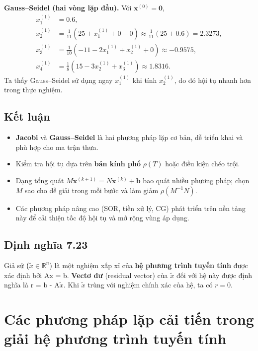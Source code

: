 \textbf{Gauss--Seidel (hai vòng lặp đầu).}
Với $\mathbf{x}^{(0)}=\mathbf{0}$,
\[
\begin{aligned}
x_1^{(1)} &= 0.6,\\
x_2^{(1)} &= \tfrac{1}{11}(25 + x_1^{(1)} + 0 - 0) \approx \tfrac{1}{11}(25 + 0.6)=2.3273,\\
x_3^{(1)} &= \tfrac{1}{10}(-11 - 2x_1^{(1)} + x_2^{(1)} + 0)\approx -0.9575,\\
x_4^{(1)} &= \tfrac{1}{8}(15 - 3x_2^{(1)} + x_3^{(1)})\approx 1.8316.
\end{aligned}
\]
Ta thấy Gauss--Seidel sử dụng ngay $x_1^{(1)}$ khi tính $x_2^{(1)}$, do đó hội tụ nhanh hơn trong thực nghiệm.

\subsection{Kết luận}

\begin{itemize}
  \item \textbf{Jacobi} và \textbf{Gauss--Seidel} là hai phương pháp lặp cơ bản, dễ triển khai và phù hợp cho ma trận thưa.
  \item Kiểm tra hội tụ dựa trên \textbf{bán kính phổ} $\rho(T)$ hoặc điều kiện chéo trội.
  \item Dạng tổng quát $M\mathbf{x}^{(k+1)} = N\mathbf{x}^{(k)} + \mathbf{b}$ bao quát nhiều phương pháp; chọn $M$ sao cho dễ giải trong mỗi bước và làm giảm $\rho(M^{-1}N)$.
  \item Các phương pháp nâng cao (SOR, tiền xử lý, CG) phát triển trên nền tảng này để cải thiện tốc độ hội tụ và mở rộng vùng áp dụng.
\end{itemize}


\subsection*{Định nghĩa 7.23}
Giả sử \textbf(\( \tilde{x} \in \mathbb{R}^n \)) là một nghiệm xấp xỉ của \textbf{hệ phương trình tuyến tính} được xác định bởi Ax = b.
\textbf{Vectơ dư} (residual vector) của \( \tilde{x} \) đối với hệ này được định nghĩa là r = b - A\( \tilde{x} \). Khi \( \tilde{x} \) trùng với nghiệm chính xác của hệ, ta có \( r = 0 \).


\section{Các phương pháp lặp cải tiến trong giải hệ phương trình tuyến tính}

